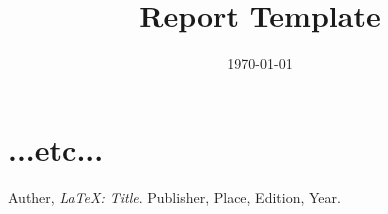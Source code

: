 \documentclass[a4wide, 11pt]{article}
\begin{document}
\title{Report Template}
\author{}
\date{\today}
\maketitle

\section{...etc...}

\begin{thebibliography}{9}

  Auther,
  \emph{\LaTeX: Title}.
  Publisher, Place,
  Edition,
  Year.

\end{thebibliography}
\end{document}
